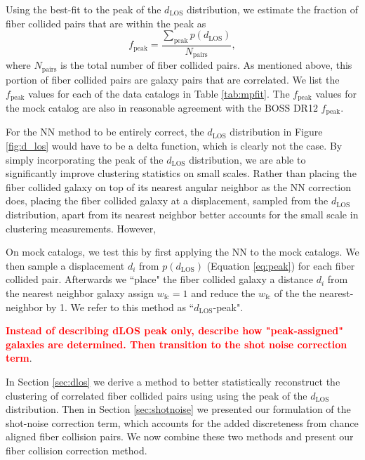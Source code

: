 \documentclass{emulateapj}
\newcommand{\todo}[1]{{\bf \textcolor{red}{ #1}}}
\begin{document}
Using the best-fit to the peak of the $d_{\mathrm{LOS}}$ distribution, we estimate the fraction of fiber collided pairs that are within the peak as
\begin{equation} \label{eq:fpeak}
f_{\mathrm{peak}} = \frac{\sum\limits_{\mathrm{peak}} p(d_{\mathrm{LOS}})}{N_{\mathrm{pairs}}}, 
\end{equation}
where $N_{\mathrm{pairs}}$ is the total number of fiber collided pairs. As mentioned above, this portion of fiber collided pairs are galaxy pairs that are correlated. We list the $f_{\mathrm{peak}}$ values for each of the data catalogs in Table \ref{tab:mpfit}. The $f_\mathrm{peak}$ values for the mock catalog are also in reasonable agreement with the BOSS DR12 $f_\mathrm{peak}$. 

For the NN method to be entirely correct, the $d_{\mathrm{LOS}}$ distribution in Figure \ref{fig:d_los} would have to be a delta function, which is clearly not the case. By simply incorporating the peak of the $d_{\mathrm{LOS}}$ distribution, we are able to significantly improve clustering statistics on small scales. Rather than placing the fiber collided galaxy on top of its nearest angular neighbor as the NN correction does, placing the fiber collided galaxy at a displacement, sampled from the $d_{\mathrm{LOS}}$ distribution, apart from its nearest neighbor better accounts for the small scale in clustering measurements. However, 

On mock catalogs, we test this by first applying the NN to the mock catalogs. We then sample a displacement $d_i$ from $p(d_\mathrm{LOS})$ (Equation \ref{eq:peak}) for each fiber collided pair. Afterwards we ``place" the fiber collided galaxy a distance $d_i$ from the nearest neighbor galaxy assign $w_\mathrm{fc} = 1$ and reduce the $w_\mathrm{fc}$ of the the nearest-neighbor by 1. We refer to this method as ``$d_\mathrm{LOS}$-peak". 

\todo{Instead of describing dLOS peak only, describe how "peak-assigned" galaxies are determined. Then transition to the shot noise correction term}. 

In Section \ref{sec:dlos} we derive a method to better statistically reconstruct the clustering of correlated fiber collided pairs using using the peak of the $d_\mathrm{LOS}$ distribution. Then in Section \ref{sec:shotnoise} we presented our formulation of the shot-noise correction term, which accounts for the added discreteness from chance aligned fiber collision pairs. We now combine these two methods and present our fiber collision correction method. 
\end{document}

